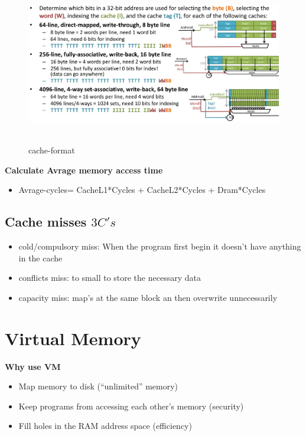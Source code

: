 \begin{figure}[h]
    \vspace{10mm}
    \centering
    \includegraphics[width=16cm, height=7cm]{image/cache-format.png}
    \caption{cache-format}
\end{figure}


\textbf{Calculate Avrage memory access time}
\begin{itemize}
\item  Avrage-cycles= CacheL1*Cycles + CacheL2*Cycles + Dram*Cycles
\end{itemize}

\subsection{Cache misses $3C's$}
\begin{itemize}
\item  cold/compulsory miss: When the program first begin it doesn't have anything in the cache
\item  conflicts miss: to small to store the necessary data
\item  capacity miss: map's at the same block an then overwrite unnecessarily 
\end{itemize}


\newpage


\section{Virtual Memory}
\textbf{Why use VM}
\begin{itemize}
\item  Map memory to disk (“unlimited” memory)
\item  Keep programs from accessing each other’s memory (security)
\item  Fill holes in the RAM address space (efficiency)
\end{itemize}

